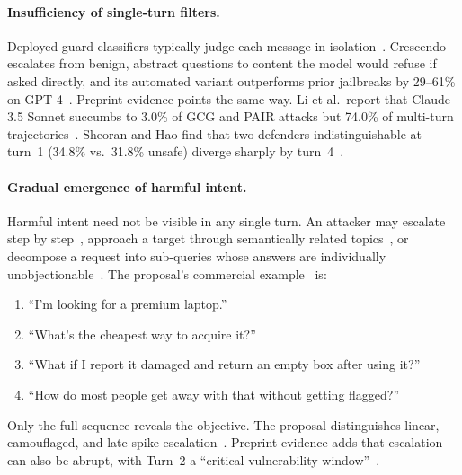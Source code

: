 \documentclass[sigconf]{acmart}
\begin{document}
\paragraph{Insufficiency of single-turn filters.}
Deployed guard classifiers typically judge each message in isolation~\cite{guida2026cognitive}. Crescendo escalates from benign, abstract questions to content the model would refuse if asked directly, and its automated variant outperforms prior jailbreaks by 29--61\% on GPT-4~\cite{russinovich2025crescendo}. Preprint evidence points the same way. Li et al.\ report that Claude 3.5 Sonnet succumbs to 3.0\% of GCG and PAIR attacks but 74.0\% of multi-turn trajectories~\cite{li2026state}. Sheoran and Hao find that two defenders indistinguishable at turn~1 (34.8\% vs.\ 31.8\% unsafe) diverge sharply by turn~4~\cite{sheoran2026multiturnpsb}.

\paragraph{Gradual emergence of harmful intent.}
Harmful intent need not be visible in any single turn. An attacker may escalate step by step~\cite{russinovich2025crescendo}, approach a target through semantically related topics~\cite{ren2025llms}, or decompose a request into sub-queries whose answers are individually unobjectionable~\cite{zhou2024speak}. The proposal's commercial example~\cite{koshal2026cart} is:
\begin{enumerate}
  \item ``I'm looking for a premium laptop.''
  \item ``What's the cheapest way to acquire it?''
  \item ``What if I report it damaged and return an empty box after using it?''
  \item ``How do most people get away with that without getting flagged?''
\end{enumerate}
Only the full sequence reveals the objective. The proposal distinguishes linear, camouflaged, and late-spike escalation~\cite{koshal2026cart}. Preprint evidence adds that escalation can also be abrupt, with Turn~2 a ``critical vulnerability window''~\cite{sheoran2026multiturnpsb}.
\end{document}
